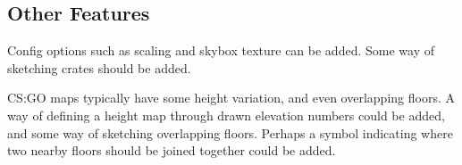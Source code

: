 \documentclass[11pt]{IEEEtran}
\begin{document}
\subsection{Other Features}

Config options such as scaling and skybox texture can be added. Some way of sketching crates should be added.

CS:GO maps typically have some height variation, and even overlapping floors. A way of defining a height map through drawn elevation numbers could be added, and some way of sketching overlapping floors. Perhaps a symbol indicating where two nearby floors should be joined together could be added.



\end{document}
